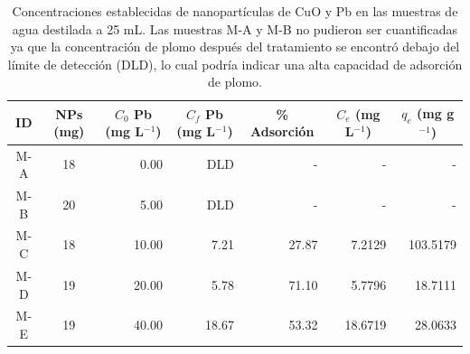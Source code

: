 \documentclass[fleqn,10pt]{SelfArx} %
\begin{document}
\begin{table}[ht]
\centering
\caption{Concentraciones establecidas de nanopartículas de CuO y Pb en las muestras de agua destilada a 25 mL. Las muestras M-A y M-B no pudieron ser cuantificadas ya que la concentración de plomo después del tratamiento se encontró debajo del límite de detección (DLD), lo cual podría indicar una alta capacidad de adsorción de plomo.\\}

    \begin{tabular}{ccrrrrr}
    
        \toprule
        \textbf{ID} & \textbf{NPs (mg)} & \multicolumn{1}{c}{\textbf{$C_0$ Pb (mg L$^{-1}$)}} & \multicolumn{1}{c}{\textbf{$C_f$ Pb (mg L$^{-1}$)}} & \multicolumn{1}{c}{\textbf{\% Adsorción}} & \multicolumn{1}{c}{\textbf{$C_e$ (mg L$^{-1}$)}} & \multicolumn{1}{c}{\textbf{$q_e$ (mg g$^{-1}$)}} \\
        \midrule
        M-A         & 18                & 0.00                                                     & DLD                                                      & -                                        & -                                                & -                                                \\
        M-B         & 20                & 5.00                                                     & DLD                                                      & -                                        & -                                                & -                                                \\
        M-C         & 18                & 10.00                                                    & 7.21                                                     & 27.87                                    & 7.2129                                           & 103.5179                                         \\
        M-D         & 19                & 20.00                                                    & 5.78                                                     & 71.10                                    & 5.7796                                           & 18.7111                                          \\
        M-E         & 19                & 40.00                                                    & 18.67                                                    & 53.32                                    & 18.6719                                          & 28.0633                                          \\

\end{tabular}
\end{table}
\end{document}
